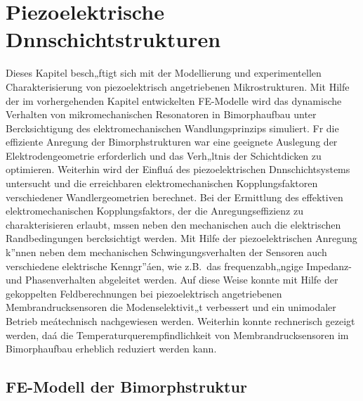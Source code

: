 \chapter{Piezoelektrische Dnnschichtstrukturen}
\label{piezoelektrisch}

Dieses Kapitel besch„ftigt sich mit der Modellierung und experimentellen
Charakterisierung von piezoelektrisch angetriebenen Mikrostrukturen.
Mit Hilfe der im vorhergehenden Kapitel entwickelten FE-Modelle wird
das dynamische Verhalten von mikromechanischen Resonatoren in Bimorphaufbau
unter Bercksichtigung des elektromechanischen Wandlungsprinzips simuliert.
Fr die effiziente Anregung der Bimorphstrukturen war eine geeignete
Auslegung der Elektrodengeometrie erforderlich und das Verh„ltnis der
Schichtdicken zu optimieren. Weiterhin wird der Einfluá des piezoelektrischen
Dnnschichtsystems untersucht und die erreichbaren elektromechanischen
Kopplungsfaktoren verschiedener Wand\-lergeometrien berechnet.
Bei der Ermittlung des effektiven elektromechanischen Kopplungsfaktors, der
die Anregungseffizienz zu charakterisieren erlaubt, mssen neben den
mechanischen auch die elektrischen Randbedingungen bercksichtigt werden.
Mit Hilfe der piezoelektrischen Anregung k”nnen neben dem mechanischen
Schwingungsverhalten der Sensoren auch verschiedene elektrische
Kenngr”áen, wie z.B.\ das frequenzabh„ngige Impedanz- und Phasenverhalten
abgeleitet werden. Auf diese Weise konnte mit Hilfe der
gekoppelten Feldberechnungen bei piezoelektrisch angetriebenen
Membrandrucksensoren die Modenselektivit„t verbessert und ein unimodaler
Betrieb meátechnisch nachgewiesen werden. Weiterhin konnte rechnerisch
gezeigt werden, daá die Temperaturquerempfindlichkeit von
Membrandrucksensoren im Bimorphaufbau erheblich reduziert werden kann.


\section{FE-Modell der Bimorphstruktur}
\label{bimorphstruktur}

